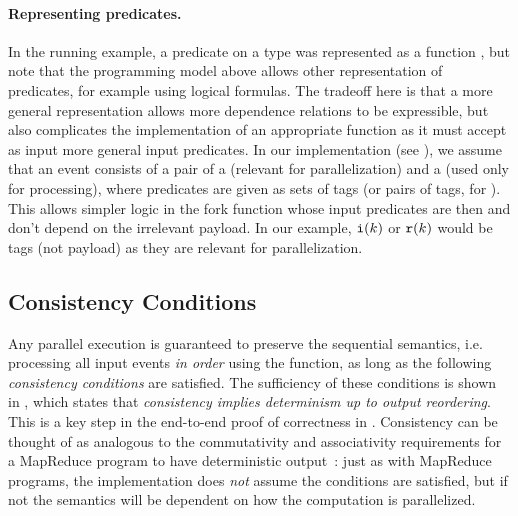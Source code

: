 \paragraph{Representing predicates.}
In the running example, a predicate on a type  was represented
as a function , but note that the programming model above allows other
representation of predicates, for example using logical formulas.
The tradeoff here is that a more general representation allows
more dependence relations to be expressible, but also complicates the
implementation of an appropriate  function as it must accept
as input more general input predicates.
In our implementation (see ), we assume
that an event consists of a pair of a  (relevant for parallelization) and a  (used only for processing),
where predicates are given as sets of tags (or pairs of tags, for ).
This allows simpler logic in the fork function whose input predicates
are then  and don't depend on the irrelevant payload.
In our example, $\texttt{i}(k)$ or $\texttt{r}(k)$ would be tags (not payload)
as they are relevant for parallelization.

\subsection{Consistency Conditions}
\label{dgs:ssec:prog-model-correctness}

Any parallel execution
is guaranteed to preserve the sequential semantics, i.e. processing
all input events \emph{in order} using the  function,
as long as the following \emph{consistency conditions} are
satisfied.
The sufficiency of these conditions is shown in
, which states
that \emph{consistency implies determinism up to output reordering}.
This is a key step in the end-to-end proof of correctness in .
Consistency can be thought of as analogous to the commutativity and
associativity requirements for a MapReduce program to have
deterministic output~\cite{dean2008mapreduce}: just as with MapReduce
programs, the implementation does \emph{not} assume the conditions are
satisfied, but if not the semantics will be dependent on how the
computation is parallelized.

